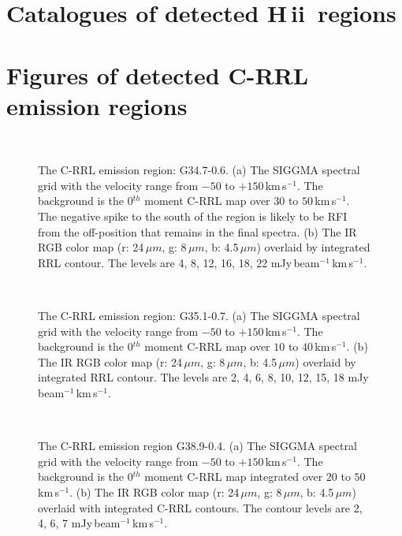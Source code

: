 \documentclass[manuscript]{aastex61}
\newcommand{\hii}{{\rm H\,}{{\sc ii}}}
\newcommand{\kms}{\,km\,s$^{-1}$}
\newcommand{\um}{\mu m}
\begin{document}
\newpage
\appendix

\section{Catalogues of detected \hii\ regions}\label{appe:cata}


\newpage

\section{Figures of detected C-RRL emission regions}\label{appe:crrl}

\begin{figure}[H]
	\centering
	\\ 
	\caption{The C-RRL emission region: G34.7-0.6.
	(a) The SIGGMA spectral grid with the velocity range from $-50$ to $+150$\kms.
	The background is the 0$^{th}$ moment C-RRL map over $30$ to $50$\kms.
	The negative spike to the south of the region is likely to be RFI from the off-position that remains in the final spectra.
	(b) The IR RGB color map (r: 24\,$\um$, g: 8\,$\um$, b: 4.5\,$\um$) overlaid by integrated RRL contour.
	The levels are 4, 8, 12, 16, 18, 22 mJy\,beam$^{-1}$\kms.}
	\label{fig_crrl-g347}
\end{figure}
\begin{figure}[H]
	\centering
	\\
	\caption{The C-RRL emission region: G35.1-0.7.
	(a) The SIGGMA spectral grid with the velocity range from $-50$ to $+150$\kms.
	The background is the 0$^{th}$ moment C-RRL map over $10$ to $40$\kms.
	(b) The IR RGB color map (r: 24\,$\um$, g: 8\,$\um$, b: 4.5\,$\um$) overlaid by integrated RRL contour.
	The levels are 2, 4, 6, 8, 10, 12, 15, 18 mJy\,beam$^{-1}$\kms.}
	\label{fig_crrl-g351}
\end{figure}
\begin{figure}[H]
	\centering
	\\
	\caption{The C-RRL emission region G38.9-0.4.
	(a) The SIGGMA spectral grid with the velocity range from $-50$ to $+150$\kms.
	The background is the 0$^{th}$ moment C-RRL map integrated over $20$ to $50$\kms.
	(b) The IR RGB color map (r: 24\,$\um$, g: 8\,$\um$, b: 4.5\,$\um$) overlaid with integrated C-RRL contours.
	The contour levels are 2, 4, 6, 7 mJy\,beam$^{-1}$\kms.}
	\label{fig_crrl-g389}
\end{figure}
\end{document}
